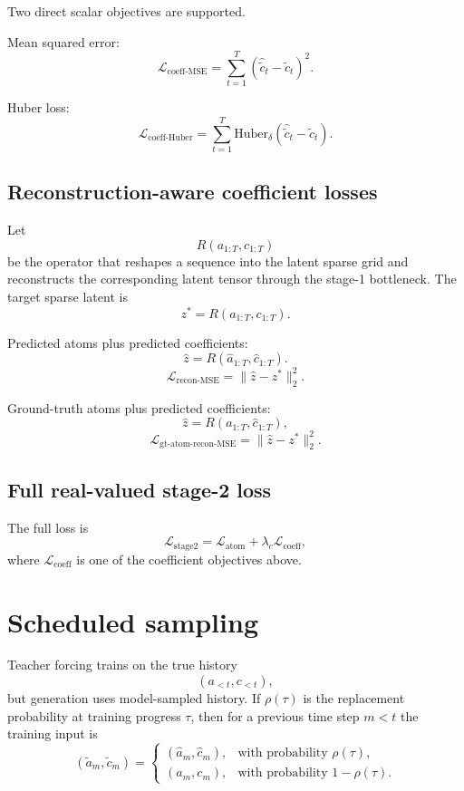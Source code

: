 \documentclass[11pt]{article}
\begin{document}
Two direct scalar objectives are supported.

Mean squared error:
\[
\mathcal{L}_{\text{coeff-MSE}}
=
\sum_{t=1}^{T} (\hat{\tilde c}_t - \tilde c_t)^2.
\]

Huber loss:
\[
\mathcal{L}_{\text{coeff-Huber}}
=
\sum_{t=1}^{T}
\mathrm{Huber}_\delta(\hat{\tilde c}_t - \tilde c_t).
\]

\subsection{Reconstruction-aware coefficient losses}

Let
\[
R(a_{1:T}, c_{1:T})
\]
be the operator that reshapes a sequence into the latent sparse grid and reconstructs the corresponding latent tensor through the stage-1 bottleneck. The target sparse latent is
\[
z^* = R(a_{1:T}, c_{1:T}).
\]

Predicted atoms plus predicted coefficients:
\[
\hat z = R(\hat a_{1:T}, \hat c_{1:T}).
\]
\[
\mathcal{L}_{\text{recon-MSE}}
=
\|\hat z - z^*\|_2^2.
\]

Ground-truth atoms plus predicted coefficients:
\[
\hat z = R(a_{1:T}, \hat c_{1:T}),
\]
\[
\mathcal{L}_{\text{gt-atom-recon-MSE}}
=
\|\hat z - z^*\|_2^2.
\]

\subsection{Full real-valued stage-2 loss}

The full loss is
\[
\mathcal{L}_{\text{stage2}}
=
\mathcal{L}_{\text{atom}}
+
\lambda_c \mathcal{L}_{\text{coeff}},
\]
where $\mathcal{L}_{\text{coeff}}$ is one of the coefficient objectives above.

\section{Scheduled sampling}

Teacher forcing trains on the true history
\[
(a_{<t}, c_{<t}),
\]
but generation uses model-sampled history. If $\rho(\tau)$ is the replacement probability at training progress $\tau$, then for a previous time step $m < t$ the training input is
\[
(\tilde a_m, \tilde c_m)
=
\begin{cases}
(\hat a_m, \hat c_m), & \text{with probability } \rho(\tau), \\
(a_m, c_m), & \text{with probability } 1 - \rho(\tau).
\end{cases}
\]
\end{document}
